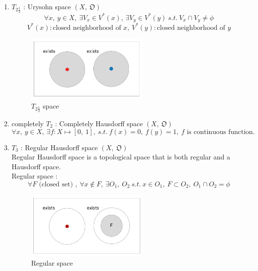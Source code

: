 \documentclass[english,dvipdfmx]{jsarticle}
\begin{document}
\begin{description}
\begin{enumerate}
            \item $T_{2 \frac{1}{2}}$ : Urysohn space $(X,\ \mathfrak{O})$ \\
                $$\forall x,\ y \in X,\ \exists V_x \in V^*(x),\ \exists V_y \in V^*(y) \ s.t. \ V_x \cap V_y \neq \phi$$
                $$V^*(x) : \text{closed neighborhood of } x,\ V^*(y) : \text{closed neighborhood of } y$$
                \begin{figure}[H]
                    \begin{center}
                        \includegraphics[clip,width=6cm]{./T2_2.png}
                        \caption{$T_{2 \frac{1}{2}}$ space}
                    \end{center}
                \end{figure}
            
            \item completely $T_{2}$ : Completely Hausdorff space $(X,\ \mathfrak{O})$ \\
                $$\forall x,\ y \in X,\ \exists f : X \mapsto [0,\ 1],\ s.t. \ f(x) = 0,\ f(y) = 1,\ f \text{ is continuous function.}$$
            
            \item $T_{3}$ : Regular Hausdorff space $(X,\ \mathfrak{O})$ \\
                Regular Hausdorff space is a topological space that is both regular and a Hausdorff space. \\
                Regular space : $$\forall F \text{ (closed set) },\ \forall x \notin F ,\ \exists O_1,\ O_2 \ s.t. \ x \in O_1,\ F \subset O_2,\ O_1 \cap O_2 = \phi $$
                \begin{figure}[H]
                    \begin{center}
                        \includegraphics[clip,width=6cm]{./T3.png}
                        \caption{Regular space}
                    \end{center}
                \end{figure}


\end{enumerate}
\end{description}
\end{document}
